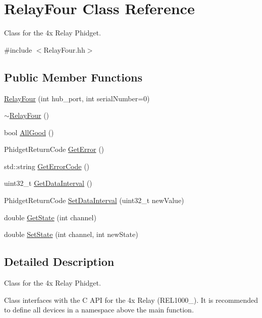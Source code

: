 \hypertarget{classRelayFour}{}\section{Relay\+Four Class Reference}
\label{classRelayFour}


Class for the 4x Relay Phidget.  




{\ttfamily \#include $<$Relay\+Four.\+hh$>$}

\subsection*{Public Member Functions}
\begin{DoxyCompactItemize}
\item 
\hyperlink{classRelayFour_a2ddfd3e80919ee0b87ddde0a9608cec1}{Relay\+Four} (int hub\+\_\+port, int serial\+Number=0)
\item 
\hyperlink{classRelayFour_ad3577f6c353abbbdb308cc52a1adffeb}{$\sim$\+Relay\+Four} ()
\item 
bool \hyperlink{classRelayFour_a64b6ba9a4ac452abe46d3fe03896c965}{All\+Good} ()
\item 
Phidget\+Return\+Code \hyperlink{classRelayFour_a36f0d20421a3c390644344aed6951f2a}{Get\+Error} ()
\item 
std\+::string \hyperlink{classRelayFour_aa22c7288d95a6d475c176d18b2659a04}{Get\+Error\+Code} ()
\item 
uint32\+\_\+t \hyperlink{classRelayFour_aaded0e5c95a240ce8f4f2a8e41f51de6}{Get\+Data\+Interval} ()
\item 
Phidget\+Return\+Code \hyperlink{classRelayFour_a56d7fa541ee68cbcbeb83e36e115ead8}{Set\+Data\+Interval} (uint32\+\_\+t new\+Value)
\item 
double \hyperlink{classRelayFour_a4bc7d85cf43949013dbe7e1272cd8fd5}{Get\+State} (int channel)
\item 
double \hyperlink{classRelayFour_a5590654655439dc0e12bd2d84d639bbe}{Set\+State} (int channel, int new\+State)
\end{DoxyCompactItemize}


\subsection{Detailed Description}
Class for the 4x Relay Phidget. 

Class interfaces with the C A\+PI for the 4x Relay (R\+E\+L1000\+\_). It is recommended to define all devices in a namespace above the main function. 

